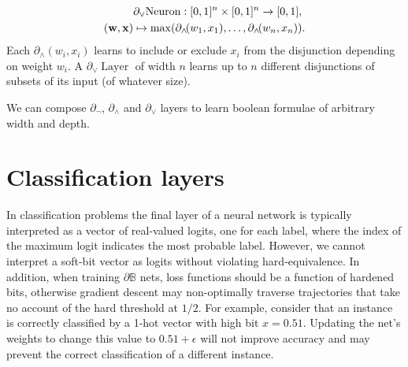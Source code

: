 \documentclass{article}
\theoremstyle{plain}
\theoremstyle{definition}
\theoremstyle{remark}
\begin{document}
\begin{equation*}
\begin{aligned}
& \partial_{\vee}\!\operatorname{Neuron}: [0,1]^{n} \times [0,1]^{n} \to [0,1], \\
({\bf w}, {\bf x}) &\mapsto \max(\partial_{\wedge}\!(w_{1}, x_{1}), \dots, \partial_{\wedge}\!(w_{n}, x_{n}))\text{.}
\end{aligned}
\end{equation*}
Each $\partial_{\wedge}(w_{i},x_{i})$ learns to include or exclude $x_{i}$ from the disjunction depending on weight $w_{i}$. A $\partial_{\vee}\!\operatorname{Layer}$ of width $n$ learns up to $n$ different disjunctions of subsets of its input (of whatever size).

We can compose $\partial_{\neg}$, $\partial_{\wedge}$ and $\partial_{\vee}$ layers to learn boolean formulae of arbitrary width and depth.

\section{Classification layers}\label{sec:classification}

In classification problems the final layer of a neural network is typically interpreted as a vector of real-valued logits, one for each label, where the index of the maximum logit indicates the most probable label. However, we cannot interpret a soft-bit vector as logits without violating hard-equivalence. In addition, when training $\partial\mathbb{B}$ nets, loss functions should be a function of hardened bits, otherwise gradient descent may non-optimally traverse trajectories that take no account of the hard threshold at $1/2$. For example, consider that an instance is correctly classified by a 1-hot vector with high bit $x=0.51$. Updating the net's weights to change this value to $0.51+\epsilon$ will not improve accuracy and may prevent the correct classification of a different instance. 
\end{document}
